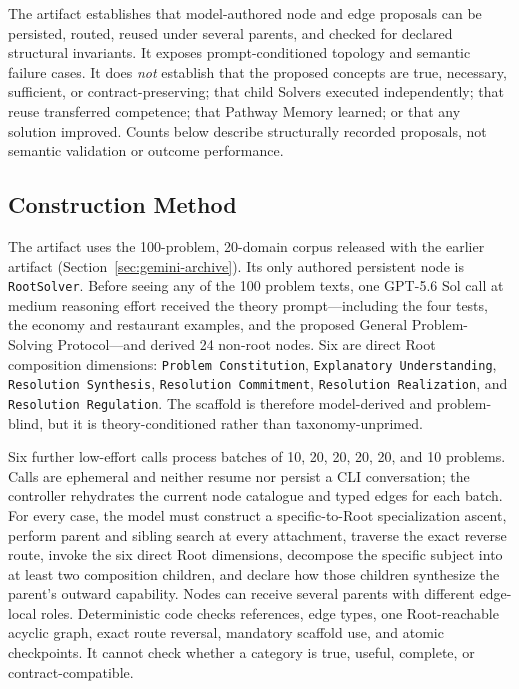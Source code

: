 \documentclass[11pt]{article}
\let\oldtexttt\texttt
\renewcommand{\texttt}[1]{\oldtexttt{\small #1}}
\begin{document}
\begin{rfbox}[title=Evidence boundary of the construction artifact]
\small
The artifact establishes that model-authored node and edge proposals can be persisted, routed, reused under several parents, and checked for declared structural invariants. It exposes prompt-conditioned topology and semantic failure cases. It does \emph{not} establish that the proposed concepts are true, necessary, sufficient, or contract-preserving; that child Solvers executed independently; that reuse transferred competence; that Pathway Memory learned; or that any solution improved. Counts below describe structurally recorded proposals, not semantic validation or outcome performance.
\end{rfbox}

\subsection{Construction Method}
\label{sec:mandatory-run}

The artifact uses the 100-problem, 20-domain corpus released with the earlier artifact (Section~\ref{sec:gemini-archive}). Its only authored persistent node is \texttt{RootSolver}. Before seeing any of the 100 problem texts, one GPT-5.6 Sol call at medium reasoning effort received the theory prompt---including the four tests, the economy and restaurant examples, and the proposed General Problem-Solving Protocol---and derived 24 non-root nodes. Six are direct Root composition dimensions: \texttt{Problem Constitution}, \texttt{Explanatory Understanding}, \texttt{Resolution Synthesis}, \texttt{Resolution Commitment}, \texttt{Resolution Realization}, and \texttt{Resolution Regulation}. The scaffold is therefore model-derived and problem-blind, but it is theory-conditioned rather than taxonomy-unprimed.

Six further low-effort calls process batches of 10, 20, 20, 20, 20, and 10 problems. Calls are ephemeral and neither resume nor persist a CLI conversation; the controller rehydrates the current node catalogue and typed edges for each batch. For every case, the model must construct a specific-to-Root specialization ascent, perform parent and sibling search at every attachment, traverse the exact reverse route, invoke the six direct Root dimensions, decompose the specific subject into at least two composition children, and declare how those children synthesize the parent's outward capability. Nodes can receive several parents with different edge-local roles. Deterministic code checks references, edge types, one Root-reachable acyclic graph, exact route reversal, mandatory scaffold use, and atomic checkpoints. It cannot check whether a category is true, useful, complete, or contract-compatible.
\end{document}

